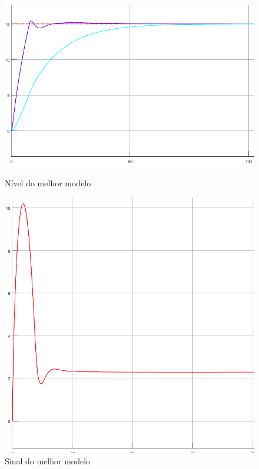 \documentclass[
	12pt,				%
	openany,			%
	oneside,			%
	a4paper,			%
	english,			%
	french,				%
	spanish,			%
	brazil,				%
	]{abntex2}
\begin{document}
{\begin{figure}[h]
	\centering
	\begin{minipage}{.5\textwidth}
		\centering
		\includegraphics[scale=0.28]{imagens/niveis_3a_1.png}
		\caption{Nível do melhor modelo}
		\label{fig:nivel_3a_1}
	\end{minipage}%
	\begin{minipage}{.5\textwidth}
		\centering
		\includegraphics[scale=0.28]{imagens/sinal_3a_1.png}
		\caption{Sinal do melhor modelo}
		\label{fig:sinal_3a_1}
	\end{minipage}
\end{figure}

}
\end{document}
